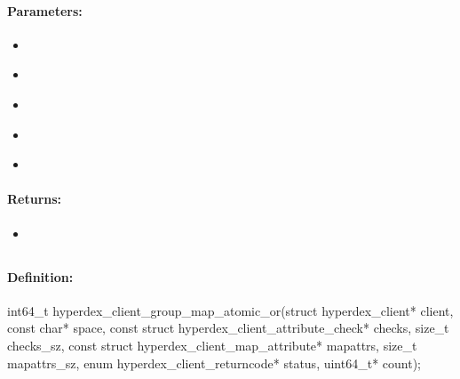 \paragraph{Parameters:}
\begin{itemize}[noitemsep]
\item {}\\

\item {}\\

\item {}\\

\item {}\\

\item {}\\

\end{itemize}

\paragraph{Returns:}
\begin{itemize}[noitemsep]
\item {}\\

\end{itemize}

\pagebreak
\subsection{}
\label{api:c:group_map_atomic_or}


\paragraph{Definition:}
\begin{ccode}
int64_t hyperdex_client_group_map_atomic_or(struct hyperdex_client* client,
        const char* space,
        const struct hyperdex_client_attribute_check* checks, size_t checks_sz,
        const struct hyperdex_client_map_attribute* mapattrs, size_t mapattrs_sz,
        enum hyperdex_client_returncode* status,
        uint64_t* count);
\end{ccode}

